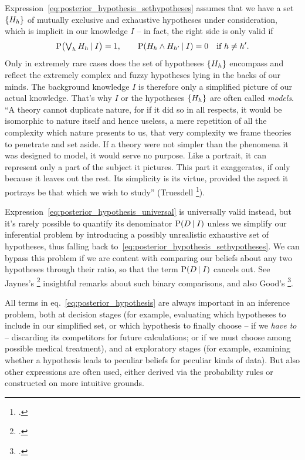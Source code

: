 \documentclass[\ifafour a4paper,12pt,\else a5paper,10pt,\fi%
onecolumn,oneside,article,%
british%
]{memoir}
\theoremstyle{remark}
\theoremstyle{innote}
\newcommand*{\citep}{\footcites}
\newcommand*{\citey}{\footcites}%
\DeclarePairedDelimiter\set{\{}{\}}
\newcommand*{\p}{\mathrm{P}}%
\renewcommand*{\|}[1][]{\nonscript\,#1\vert\nonscript\;\mathopen{}}
\newcommand*{\sect}{\S}%
\newcommand*{\sects}{\S\S}%
\newcommand*{\eqn}{eq.}%
\newcommand*{\tlor}{\mathop{\textstyle\bigvee}\nolimits}
\newcommand*{\yK}{I}
\begin{document}
Expression~\eqref{eq:posterior_hypothesis_sethypotheses} assumes that
we have a set $\set{H_{h}}$ of mutually exclusive and exhaustive hypotheses
under consideration, which is implicit in our knowledge $\yK$ -- in fact,
the right side is only valid if
\begin{equation}
  \label{eq:implicit_knowledge}
  \p\bigl(\tlor_{h} H_{h} \| \yK\bigr) = 1,
  \qquad
  \p(H_{h} \land H_{h'} \| \yK) = 0 \quad \text{if $h \ne h'$}.
\end{equation}
Only in extremely rare cases does the set of hypotheses $\set{H_{h}}$
encompass and reflect the extremely complex and fuzzy hypotheses lying
in the backs of our minds. The background knowledge $\yK$ is therefore only
a simplified picture of our actual knowledge. That's why $\yK$ or the
hypotheses $\set{H_{h}}$ are often called \emph{models}.\; \enquote{A
  theory cannot duplicate nature, for if it did so in all respects, it
  would be isomorphic to nature itself and hence useless, a mere repetition
  of all the complexity which nature presents to us, that very complexity
  we frame theories to penetrate and set aside. If a theory were not
  simpler than the phenomena it was designed to model, it would serve no
  purpose. Like a portrait, it can represent only a part of the subject it
  pictures. This part it exaggerates, if only because it leaves out the
  rest. Its simplicity is its virtue, provided the aspect it portrays be
  that which we wish to study} (Truesdell \citep[Prologue p.~xvi]{truesdelletal1980}).

Expression~\eqref{eq:posterior_hypothesis_universal} is universally valid
instead, but it's rarely possible to quantify its denominator
$\p(D \| \yK)$ unless we simplify our inferential problem by introducing a
possibly unrealistic exhaustive set of hypotheses, thus falling back
to~\eqref{eq:posterior_hypothesis_sethypotheses}. We can bypass this
problem if we are content with comparing our beliefs about any two
hypotheses through their ratio, so that the term $\p(D \| \yK)$ cancels
out. See Jaynes's \citey[\sects~4.3--4.4]{jaynes1994_r2003} insightful
remarks about such binary comparisons, and also Good's
\citey[\sect~6.3--6.6]{good1950}.

\bigskip

All terms in \eqn~\eqref{eq:posterior_hypothesis} are always important in
an inference problem, both at decision stages (for example, evaluating
which hypotheses to include in our simplified set, or which hypothesis to
finally choose -- if we \emph{have to} -- discarding its competitors for
future calculations; or if we must choose among possible medical
treatment), and at exploratory stages (for example, examining whether a
hypothesis leads to peculiar beliefs for peculiar kinds of data). But also
other expressions are often used, either derived via the probability rules or
constructed on more intuitive grounds.
\end{document}
